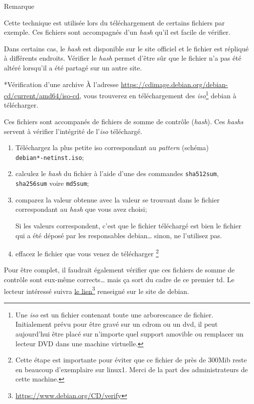 \documentclass[a4paper,11pt]{article}
\let\oldhref\href
\renewcommand{\href}[2]{\oldhref{#1}{#2}\footnote{\url{#1}}}
\begin{document}
\bigskip
\bigskip
\begin{coltbox}{Remarque}	

	Cette technique est utilisée lors du téléchargement de certains fichiers par
	exemple. Ces fichiers sont accompagnés d'un \textit{hash} qu'il est facile
	de vérifier. 

	Dans certains cas, le \textit{hash} est disponible sur le site officiel et
	le fichier est répliqué à différents endroits. Vérifier le \textit{hash}
	permet d'être sûr que le fichier n'a pas été altéré lorsqu'il a été partagé
	sur un autre site.  

\end{coltbox}

\clearpage \begin{Exercice}*{Vérification d'une archive} À l'adresse
	\url{https://cdimage.debian.org/debian-cd/current/amd64/iso-cd}, vous
	trouverez en téléchargement des \textit{iso}\footnote{Une \textit{iso} est
un fichier contenant toute une arborescance de fichier. Initialement prévu pour
être gravé sur un cdrom ou un dvd, il peut aujourd'hui être placé sur n'importe
quel support amovible ou remplacer un lecteur DVD dans une machine virtuelle.}
debian à télécharger. 
	
	Ces fichiers sont accompanés de fichiers de somme de contrôle
	(\textit{hash}).  Ces \textit{hashs} servent à vérifier l'intégrité de
	l'\textit{iso} téléchargé.

	\begin{enumerate}

		\item Téléchargez la plus petite iso correspondant au \textit{pattern}
			(schéma) \\\texttt{debian*-netinst.iso};

		\item calculez le \textit{hash} du fichier à l'aide d'une des commandes
			\texttt{sha512sum}, \texttt{sha256sum} voire \texttt{md5sum};

		\item comparez la valeur obtenue avec la valeur se trouvant dans le
			fichier correspondant au \textit{hash} que vous avez choisi;

			\medskip
			Si les valeurs correspondent, c'est que le fichier téléchargé est
			bien le fichier qui a été déposé par les responsables debian… sinon,
			ne l'utilisez pas. 
			\medskip

		\item effacez le fichier que vous venez de télécharger \footnote{Cette
			étape est importante pour éviter que ce fichier de près de 300Mib
			reste en beaucoup d'exemplaire sur linux1. Merci de la part des
			administrateurs de cette machine.}

	\end{enumerate}

	Pour être complet, il faudrait également vérifier que ces fichiers de somme
	de contrôle sont eux-même corrects… mais ça sort du cadre de ce premier td.
	Le lecteur intéressé suivra \href{https://www.debian.org/CD/verify}{le lien}
	renseigné sur le site de debian. 
	
\end{Exercice}
\end{document}
